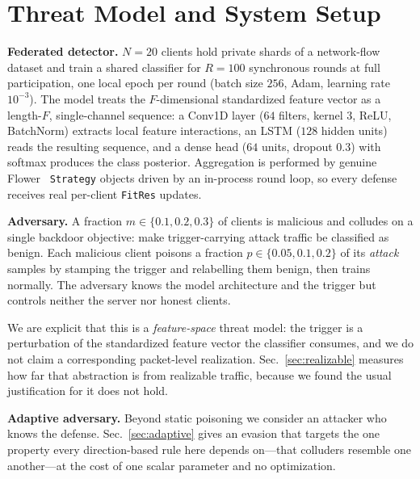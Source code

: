 \section{Threat Model and System Setup}

\textbf{Federated detector.} $N=20$ clients hold private shards of a
network-flow dataset and train a shared classifier for $R=100$ synchronous
rounds at full participation, one local epoch per round (batch size $256$, Adam,
learning rate $10^{-3}$). The model treats the $F$-dimensional standardized
feature vector as a length-$F$, single-channel sequence: a Conv1D layer ($64$
filters, kernel $3$, ReLU, BatchNorm) extracts local feature interactions, an
LSTM ($128$ hidden units) reads the resulting sequence, and a dense head ($64$
units, dropout $0.3$) with softmax produces the class posterior. Aggregation is
performed by genuine Flower~\cite{beutel2020flower} \texttt{Strategy} objects
driven by an in-process round loop, so every defense receives real per-client
\texttt{FitRes} updates.

\textbf{Adversary.} A fraction $m\in\{0.1,0.2,0.3\}$ of clients is malicious and
colludes on a single backdoor objective: make trigger-carrying attack traffic be
classified as benign. Each malicious client poisons a fraction
$p\in\{0.05,0.1,0.2\}$ of its \emph{attack} samples by stamping the trigger and
relabelling them benign, then trains normally. The adversary knows the model
architecture and the trigger but controls neither the server nor honest clients.

We are explicit that this is a \emph{feature-space} threat model: the trigger is
a perturbation of the standardized feature vector the classifier consumes, and we
do not claim a corresponding packet-level realization.
Sec.~\ref{sec:realizable} measures how far that abstraction is from realizable
traffic, because we found the usual justification for it does not hold.

\textbf{Adaptive adversary.} Beyond static poisoning we consider an attacker who
knows the defense. Sec.~\ref{sec:adaptive} gives an evasion that targets the one
property every direction-based rule here depends on---that colluders resemble one
another---at the cost of one scalar parameter and no optimization.

